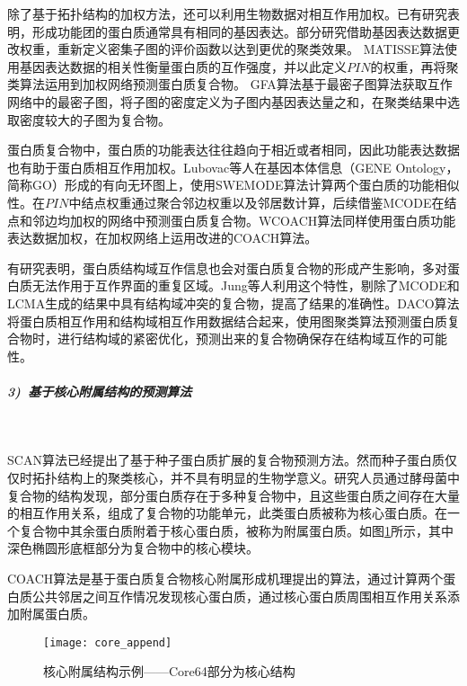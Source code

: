 除了基于拓扑结构的加权方法，还可以利用生物数据对相互作用加权。已有研究表明\cite{komurov_revealing_2007}，形成功能团的蛋白质通常具有相同的基因表达。部分研究借助基因表达数据更改权重，重新定义密集子图的评价函数以达到更优的聚类效果。
MATISSE算法\cite{ulitsky_identification_2007}使用基因表达数据的相关性衡量蛋白质的互作强度，并以此定义$PIN$的权重，再将聚类算法运用到加权网络预测蛋白质复合物。
GFA算法\cite{jianxing_feng_max-flow-based_2011}基于最密子图算法获取互作网络中的最密子图，将子图的密度定义为子图内基因表达量之和，在聚类结果中选取密度较大的子图为复合物。

蛋白质复合物中，蛋白质的功能表达往往趋向于相近或者相同，因此功能表达数据也有助于蛋白质相互作用加权。Lubovac等人\cite{lubovac_combining_2006}在基因本体信息\cite{ashburner_gene_2000}（GENE Ontology，简称GO）形成的有向无环图上，使用SWEMODE算法计算两个蛋白质的功能相似性。在$PIN$中结点权重通过聚合邻边权重以及邻居数计算，后续借鉴MCODE在结点和邻边均加权的网络中预测蛋白质复合物。WCOACH算法\cite{kouhsar_wcoach_2016}同样使用蛋白质功能表达数据加权，在加权网络上运用改进的COACH算法\cite{leung_predicting_2009}。

有研究表明，蛋白质结构域互作信息也会对蛋白质复合物的形成产生影响\cite{kim_relating_2006}，多对蛋白质无法作用于互作界面的重复区域。Jung等人\cite{jung_protein_2008}利用这个特性，剔除了MCODE和LCMA生成的结果中具有结构域冲突的复合物，提高了结果的准确性。DACO算法\cite{will_identifying_2014}将蛋白质相互作用和结构域相互作用数据结合起来，使用图聚类算法预测蛋白质复合物时，进行结构域的紧密优化，预测出来的复合物确保存在结构域互作的可能性。


\subparagraph*{3)~基于核心附属结构的预测算法} ~

SCAN算法\cite{mete_structural_2008}已经提出了基于种子蛋白质扩展的复合物预测方法。然而种子蛋白质仅仅时拓扑结构上的聚类核心，并不具有明显的生物学意义。研究人员\cite{gavin_proteome_2006}通过酵母菌中复合物的结构发现，部分蛋白质存在于多种复合物中，且这些蛋白质之间存在大量的相互作用关系，组成了复合物的功能单元，此类蛋白质被称为核心蛋白质。在一个复合物中其余蛋白质附着于核心蛋白质，被称为附属蛋白质。如图\ref{fig:core_append}所示，其中深色椭圆形底框部分为复合物中的核心模块。

COACH算法\cite{leung_predicting_2009}是基于蛋白质复合物核心附属形成机理提出的算法，通过计算两个蛋白质公共邻居之间互作情况发现核心蛋白质，通过核心蛋白质周围相互作用关系添加附属蛋白质。

\begin{figure}[htbp]
  \centering
  \texttt{[image: core\_append]}
  \caption{核心附属结构示例——Core64部分为核心结构\cite{leung_predicting_2009}}
  \label{fig:core_append}
\end{figure}

